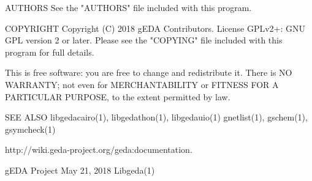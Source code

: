 AUTHORS
       See the "AUTHORS" file included with this program.

COPYRIGHT
       Copyright (C) 2018 gEDA Contributors. License GPLv2+: GNU GPL
       version 2 or later. Please see the "COPYING" file included with this
       program for full details.

       This is free software: you are free to change and redistribute it. There is NO
       WARRANTY; not even for MERCHANTABILITY or FITNESS FOR A PARTICULAR PURPOSE, to
       the extent permitted by law.

SEE ALSO
       libgedacairo(1),  libgedathon(1), libgedauio(1) gnetlist(1), gschem(1),
       gsymcheck(1)

       http://wiki.geda-project.org/geda:documentation.



gEDA Project                     May 21, 2018                       Libgeda(1)
